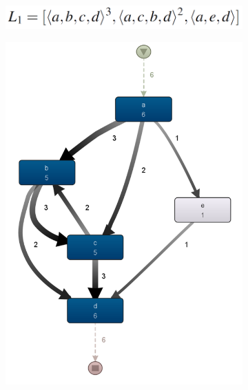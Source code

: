     \begin{figure}[htbp]
        \centering
        \begin{subfigure}{\textwidth}
            \includegraphics[scale=0.8]{capitolo 2/formula1.png}
        \end{subfigure}
        \begin{subfigure}{\textwidth}
            \includegraphics[scale=0.8]{capitolo 2/grafico1.png}
        \end{subfigure}
        \begin{subfigure}{\textwidth}

\end{subfigure}
\end{figure}
